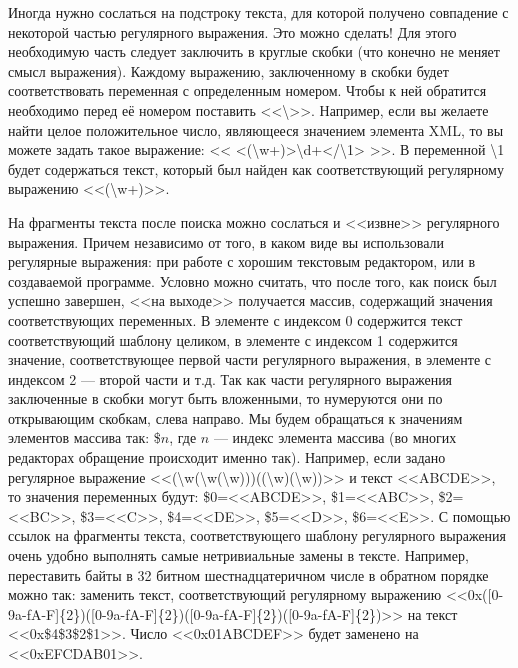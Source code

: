 Иногда нужно сослаться на подстроку текста, для которой получено совпадение с некоторой частью регулярного выражения. Это можно сделать! Для этого необходимую часть следует заключить в круглые скобки (что конечно не меняет смысл выражения). Каждому выражению, заключенному в скобки будет соответствовать переменная с определенным номером. Чтобы к ней обратится необходимо перед её номером поставить <<\textbackslash>>. Например, если вы желаете найти целое положительное число, являющееся значением элемента XML, то вы можете задать такое выражение: << <(\textbackslash w+)>\textbackslash d+</\textbackslash 1> >>. В переменной \textbackslash 1 будет содержаться текст, который был найден как соответствующий регулярному выражению <<(\textbackslash w+)>>.

На фрагменты текста после поиска можно сослаться и <<извне>> регулярного выражения. Причем независимо от того, в каком виде вы использовали регулярные выражения: при работе с хорошим текстовым редактором, или в создаваемой программе. Условно можно считать, что после того, как поиск был успешно завершен, <<на выходе>> получается массив, содержащий значения соответствующих переменных. В элементе с индексом 0 содержится текст соответствующий шаблону целиком, в элементе с индексом 1 содержится значение, соответствующее первой части регулярного выражения, в элементе с индексом 2 --- второй части и т.д. Так как части регулярного выражения заключенные в скобки могут быть вложенными, то нумеруются они по открывающим скобкам, слева направо. Мы будем обращаться к значениям элементов массива так: \$$n$, где $n$ --- индекс элемента массива (во многих редакторах обращение происходит именно так). Например, если задано регулярное выражение <<(\textbackslash w(\textbackslash w(\textbackslash w)))((\textbackslash w)(\textbackslash w))>> и текст <<ABCDE>>, то значения переменных будут: \$0=<<ABCDE>>, \$1=<<ABC>>, \$2=<<BC>>, \$3=<<C>>, \$4=<<DE>>, \$5=<<D>>, \$6=<<E>>. С помощью ссылок на фрагменты текста, соответствующего шаблону регулярного выражения очень удобно выполнять самые нетривиальные замены в тексте. Например, переставить байты в 32 битном шестнадцатеричном числе в обратном порядке можно так: заменить текст, соответствующий регулярному выражению <<0x([0-9a-fA-F]\{2\})([0-9a-fA-F]\{2\})([0-9a-fA-F]\{2\})([0-9a-fA-F]\{2\})>> на текст <<0x\$4\$3\$2\$1>>. Число <<0x01ABCDEF>> будет заменено на <<0xEFCDAB01>>.

